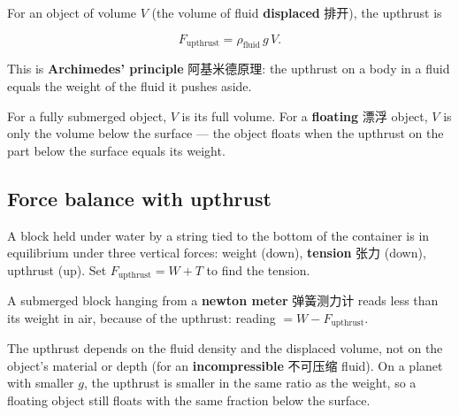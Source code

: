 \documentclass[11pt]{article}
\begin{document}
For an object of volume $V$ (the volume of fluid \textbf{displaced} 排开), the upthrust is

\[
F_{\text{upthrust}} = \rho_{\text{fluid}}\, g\, V.
\]

This is \textbf{Archimedes' principle} 阿基米德原理: the upthrust on a body in a fluid equals the weight of the fluid it pushes aside.

For a fully submerged object, $V$ is its full volume. For a \textbf{floating} 漂浮 object, $V$ is only the volume below the surface — the object floats when the upthrust on the part below the surface equals its weight.

\subsection*{Force balance with upthrust}

A block held under water by a string tied to the bottom of the container is in equilibrium under three vertical forces: weight (down), \textbf{tension} 张力 (down), upthrust (up). Set $F_{\text{upthrust}} = W + T$ to find the tension.

A submerged block hanging from a \textbf{newton meter} 弹簧测力计 reads less than its weight in air, because of the upthrust: reading $= W - F_{\text{upthrust}}$.

The upthrust depends on the fluid density and the displaced volume, not on the object's material or depth (for an \textbf{incompressible} 不可压缩 fluid). On a planet with smaller $g$, the upthrust is smaller in the same ratio as the weight, so a floating object still floats with the same fraction below the surface.
\end{document}

